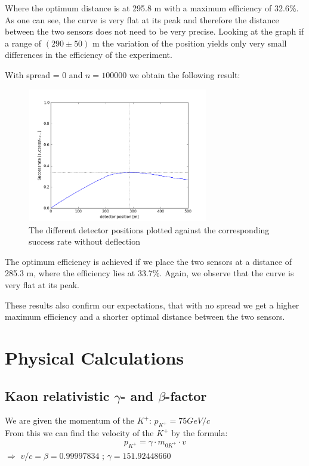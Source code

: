 \documentclass[a4paper,parskip,11pt, DIV12]{scrreprt}
\begin{document}
Where the optimum distance is at 295.8 m with a maximum efficiency of 32.6\%. As one can see, the curve is very flat at its peak and therefore the distance between the two sensors does not need to be very precise. Looking at the graph if a range of $(290 \pm 50)$ m the variation of the position yields only very small differences in the efficiency of the experiment.

With spread = 0 and $n = 100000$ we obtain the following result:

\begin{figure}[h] 
\centering
\includegraphics[width=0.7\textwidth]{Simulation100kNoSpread.png} 
\caption{The different detector positions plotted against the corresponding success rate without deflection}   
\end{figure}

The optimum efficiency is achieved if we place the two sensors at a distance of 285.3 m, where the efficiency lies at 33.7\%. Again, we observe that the curve is very flat at its peak. 

These results also confirm our expectations, that with no spread we get a higher maximum efficiency and a shorter optimal distance between the two sensors.

\clearpage

\chapter{Physical Calculations}

\section{Kaon relativistic $\gamma$- and $\beta$-factor} \label{sec:gammabeta}

We are given the momentum of the $K^+$: $p_{K^+} = 75 GeV/c$\\
From this we can find the velocity of the $K^+$ by the formula:
\begin{align*}
p_{K^+} = \gamma \cdot m_{0K^+} \cdot v
\end{align*}
$\Rightarrow$
$v/c = \beta = 0.99997834$ ;
$\gamma = 151.92448660$\\
\end{document}
